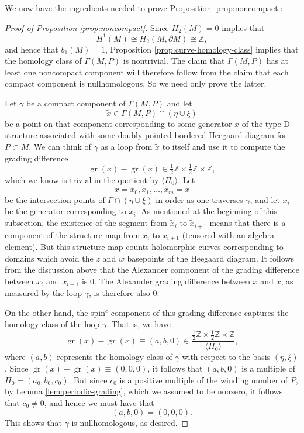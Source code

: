 \documentclass[11pt]{amsart}
\numberwithin{equation}{section}
\numberwithin{theorem}{section}
\theoremstyle{definition}
\newcommand{\Z}{\mathbb{Z}}
\newcommand{\gr}{\operatorname{gr}}
\begin{document}
We now have the ingredients needed to prove Proposition \ref{prop:noncompact}:

\begin{proof}[Proof of Proposition \ref{prop:noncompact}]
Since $H_2(M)=0$ implies that \[H^1(M)\cong H_2(M,\partial M) \cong \Z,\] and hence that $b_1(M)=1$, Proposition \ref{prop:curve-homology-class} implies that the homology class of $\Gamma(M,P)$ is nontrivial. The claim that $\Gamma(M,P)$ has at least one noncompact component will therefore follow from the claim that each compact component is nullhomologous. So we need only prove the latter.

Let $\gamma$ be a compact component of $\Gamma(M, P)$ and let \[\tilde x\in \Gamma(M,P)\cap (\eta\cup \xi)\] be a point on that component corresponding to some generator $x$ of the type D structure associated with some doubly-pointed bordered Heegaard diagram for $P\subset M$. We can think of $\gamma$ as a loop from $\tilde x$ to itself and use it to compute the grading difference \[\gr(x) - \gr(x) \in \tfrac 1 2 \Z \times \tfrac 1 2 \Z \times \Z,\] which we know is trivial in the quotient by $\langle \Pi_0 \rangle$. Let \[\tilde x = \tilde x_0, \tilde x_1,\dots,\tilde x_m = \tilde x\] be the intersection points of $\Gamma\cap (\eta \cup \xi)$ in order as one traverses $\gamma$, and let $x_i$ be the generator corresponding to $\tilde x_i$. As mentioned at the beginning of this subsection, the existence of the segment from $\tilde x_i$ to $\tilde x_{i+1}$  means that there is a component of the structure map from $x_i$ to $x_{i+1}$ (tensored with an algebra element). But this structure map counts holomorphic curves corresponding to domains which avoid the $z$ and $w$ basepoints of the Heegaard diagram. It follows from the discussion above that the Alexander component of the grading difference between $x_i$ and $x_{i+1}$ is 0. The Alexander grading difference between $x$ and $x$, as measured by the loop $\gamma$, is therefore also $0$.

On the other hand, the spin$^c$ component of this grading difference captures the homology class of the loop $\gamma$. That is, we have
\[ \gr(x) - \gr(x) \equiv (a,b,0) \in \frac{\tfrac 1 2 \Z \times \tfrac 1 2 \Z \times \Z}{\langle \Pi_0\rangle}, \]
where $(a,b)$ represents the homology class of $\gamma$ with respect to the basis $(\eta,\xi)$. Since $\gr(x) - \gr(x) \equiv (0,0,0)$, it follows that $(a,b,0)$ is a multiple of $\Pi_0 = (a_0, b_0, c_0)$. But since $c_0$ is a positive multiple of the winding number of $P$, by Lemma \ref{lem:periodic-grading}, which we assumed to be nonzero, it follows that $c_0 \neq 0$, and hence we must have that \[(a,b,0)=(0,0,0).\] This shows that $\gamma$ is nullhomologous, as desired.
\end{proof}
\end{document}

